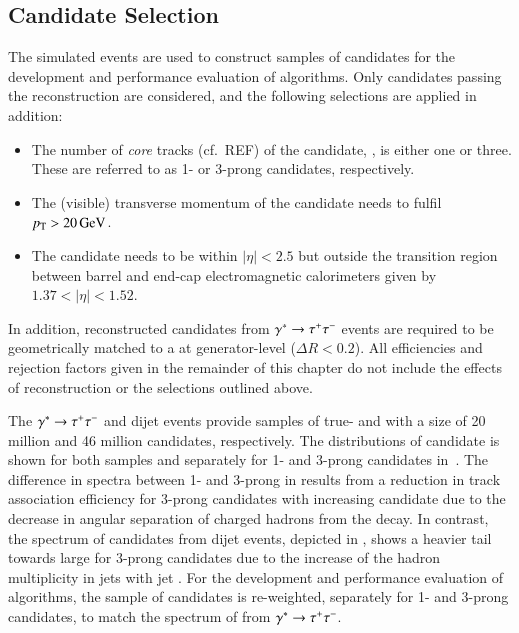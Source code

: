 \subsection{\tauhadvis Candidate Selection}
\label{sec:tauid_candidate_selection}

The simulated events are used to construct samples of \tauhadvis
candidates for the development and performance evaluation of \tauid
algorithms. Only candidates passing the \tauhadvis reconstruction are
considered, and the following selections are applied in addition:
\begin{itemize}

\item The number of \emph{core} tracks (cf.\ REF) of the \tauhadvis candidate, \Ntracks, is either
  one or three. These are referred to as 1- or 3-prong \tauhadvis
  candidates, respectively.

\item The (visible) transverse momentum of the candidate needs to
  fulfil $\pT > \SI{20}{\GeV}$.

\item The \tauhadvis candidate needs to be within $|\eta| < 2.5$ but
  outside the transition region between barrel and end-cap
  electromagnetic calorimeters given by $1.37 < |\eta| < 1.52$.

\end{itemize}
In addition, reconstructed \tauhadvis candidates from
$\gamma^{*} \to \tau^{+} \tau^{-}$ events are required to be geometrically
matched to a \tauhad at generator-level ($\Delta R < 0.2$).
All efficiencies and rejection factors given in the remainder of this
chapter do not include the effects of \tauhadvis reconstruction or the
selections outlined above.

The $\gamma^{*} \to \tau^{+} \tau^{-}$ and dijet events provide samples of
true- and \faketauhadvis with a size of 20 million and 46 million
candidates, respectively. The distributions of \tauhadvis candidate
\pT is shown for both samples and separately for 1- and 3-prong
candidates in~. The difference in \pT
spectra between 1- and 3-prong \truetauhadvis in
 results from a reduction in
track association efficiency for 3-prong \tauhadvis candidates with
increasing candidate \pT due to the decrease in angular separation of
charged hadrons from the \taulepton decay. In contrast, the \pT
spectrum of \tauhadvis candidates from dijet events, depicted in
, shows a heavier tail towards
large \pT for 3-prong candidates due to the increase of the hadron
multiplicity in jets with jet \pT. For the development and performance
evaluation of \tauid algorithms, the sample of \faketauhadvis
candidates is re-weighted, separately for 1- and 3-prong candidates,
to match the \pT spectrum of \truetauhadvis from
$\gamma^{*} \to \tau^{+} \tau^{-}$.


